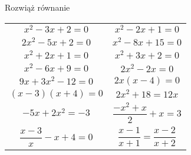\documentclass[a4paper,12pt,leqno,fleqn]{article}
\begin{document}
\newpage
Rozwiąż równanie

\begin{tabularx}{\linewidth}{@{}XX@{}}

  \begin{equation}
    x^2-3x+2=0
  \end{equation}
&
  \begin{equation}
    x^2-2x+1=0
  \end{equation}
\\
  \begin{equation}
    2x^2-5x+2=0
  \end{equation}
&
  \begin{equation}
    x^2-8x+15=0
  \end{equation}
\\
  \begin{equation}
    x^2+2x+1=0
  \end{equation}
&
  \begin{equation}
    x^2+3x+2=0
  \end{equation}
\\
  \begin{equation}
    x^2-6x+9=0
  \end{equation}
&
  \begin{equation}
    2x^2-2x=0
  \end{equation}
\\
  \begin{equation}
    9x+3x^2-12=0
  \end{equation}
&
  \begin{equation}
    2x(x-4)=0
  \end{equation}
\\
  \begin{equation}
    (x-3)(x+4)=0
  \end{equation}
&
  \begin{equation}
    2x^2+18=12x
  \end{equation}
\\
  \begin{equation}
    -5x+2x^2=-3
  \end{equation}
&
  \begin{equation}
    \frac{-x^2+x}{2}+x=3
  \end{equation}
\\
  \begin{equation}
    \frac{x-3}{x}-x+4=0
  \end{equation}
&
  \begin{equation}
    \frac{x-1}{x+1}=\frac{x-2}{x+2}
  \end{equation}

\end{tabularx}
\end{document}
